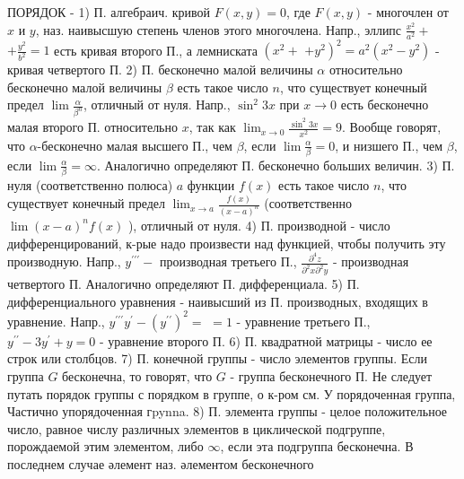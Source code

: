 \documentclass[10pt]{article}
\begin{document}
ПОРЯДОК - 1) П. алгебраич. кривой $F(x, y)=0$, где $F(x, y)$ - многочлен от $x$ и $y$, наз. наивысшую степень членов этого многочлена. Напр., эллипс $\frac{x^{2}}{a^{2}}+$ $+\frac{y^{2}}{b^{2}}=1$ есть кривая второго П., а лемниската $\left(x^{2}+\right.$ $\left.+y^{2}\right)^{2}=a^{2}\left(x^{2}-y^{2}\right)$ - кривая четвертого П. 2) П. бесконечно малой величины $\alpha$ относительно бесконечно малой величины $\beta$ есть такое число $n$, что существует конечный предел $\lim \frac{\alpha}{\beta^{n}}$, отличный от нуля. Напр., $\sin ^{2} 3 x$ при $x \rightarrow 0$ есть бесконечно малая второго П. относительно $x$, так как $\lim _{x \rightarrow 0} \frac{\sin ^{2} 3 x}{x^{2}}=9$. Вообще говорят, что $\alpha$-бесконечно малая высшего П., чем $\beta$, если $\lim \frac{\alpha}{\beta}=0$, и низшего П., чем $\beta$, если $\lim \frac{\alpha}{\beta}=\infty$. Аналогично определяют П. бесконечно больших величин. 3) П. нуля (соответственно полюса) $a$ функции $f(x)$ есть такое число $n$, что существует конечный предел $\lim _{x \rightarrow a} \frac{f(x)}{(x-a)^{n}}$ (соответственно $\lim (x-a)^{n} f(x)$ ), отличный от нуля. 4) П. производной - число дифференцирований, к-рые надо произвести над функцией, чтобы получить эту производную. Напр., $y^{\prime \prime \prime}-$ производная третьего П., $\frac{\partial^{4} z}{\partial^{2} x \partial^{2} y}$ - производная четвертого П. Аналогично определяют П. дифференциала. 5) П. дифференциального уравнения - наивысший из П. производных, входящих в уравнение. Напр., $y^{\prime \prime \prime} y^{\prime}-\left(y^{\prime \prime}\right)^{2}=$ $=1$ - уравнение третьего П., $y^{\prime \prime}-3 y^{\prime}+y=0$ - уравнение второго П. 6) П. квадратной матрицы - число ее строк или столбцов. 7) П. конечной группы - число элементов группы. Если группа $G$ бесконечна, то говорят, что $G$ - группа бесконечного П. Не следует путать порядок группы с порядком в группе, о к-ром см. У порядоченная группа, Частично упорядоченная гpynna. 8) П. элемента группы - целое положительное число, равное числу различных элементов в циклической подгруппе, порождаемой этим элементом, либо $\infty$, если эта подгруппа бесконечна. В последнем случае әлемент наз. әлементом бесконечного
\end{document}
